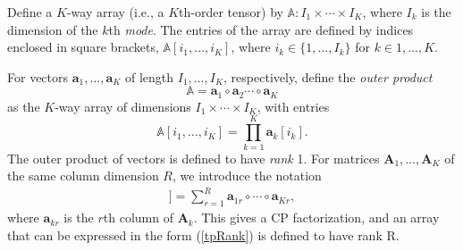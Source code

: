 \documentclass[12pt]{article}
\def\ctimes{\times \cdots \times}
\def\V{\mathbf{V}}
\def\A{\mathbf{A}}
\def\a{\mathbf{a}}
\def\AA{\mathbb{A}}
\def\v{\mathbf{v}}
\def\tp#1{[\![#1]\!]}
\begin{document}
Define a $K$-way array (i.e., a $K$th-order tensor) by $\AA: I_1 \ctimes I_K$, where $I_k$ is the dimension of the $k$th \emph{mode}.  The entries of the array are defined by indices enclosed in square brackets, $\AA[i_1,\hdots,i_K]$, where $i_k \in \{1,\hdots,I_k\}$ for $k \in 1,\hdots, K$.  

For vectors $\a_1,\hdots,\a_K$ of length $I_1,\hdots, I_K$, respectively, define the \emph{outer product}
\[
\AA = \a_1 \circ \a_2 \cdots \circ \a_K
\]
as the $K$-way array of dimensions $I_1 \ctimes I_K$, with entries
\[\AA[i_1,\hdots,i_K] = \prod_{k=1}^K \a_{k}[i_k]. \]
The outer product of vectors is defined to have \emph{rank} 1.
For matrices $\A_1, \hdots, \A_K$ of the same column dimension $R$, we introduce the notation
\begin{align}
\tp{\A_1,\hdots,\A_K} = \sum_{r=1}^R \a_{1r} \circ \cdots \circ \a_{Kr},	 \label{tpRank} 
\end{align}
where $\a_{kr}$ is the $r$th column of $\A_k$.  This gives a CP factorization, and an array that can be expressed in the form (\ref{tpRank}) is defined to have rank R.   
\end{document}
